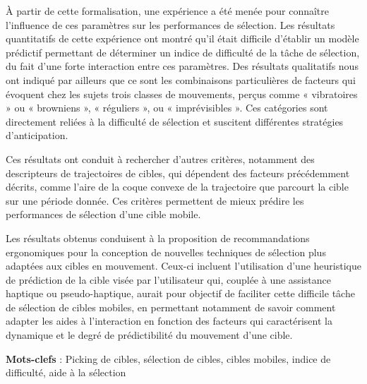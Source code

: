 À partir de cette formalisation, une expérience a été menée pour connaître l'influence de ces paramètres sur les performances de sélection. Les résultats quantitatifs de cette expérience ont montré qu'il était difficile d'établir un modèle prédictif permettant de déterminer un indice de difficulté de la tâche de sélection, du fait d'une forte interaction entre ces paramètres. Des résultats qualitatifs nous ont indiqué par ailleurs que ce sont les combinaisons particulières de facteurs qui évoquent chez les sujets trois classes de mouvements, perçus comme « vibratoires » ou « browniens », « réguliers », ou « imprévisibles ». Ces catégories sont directement reliées à la difficulté de sélection et suscitent différentes stratégies d'anticipation.

Ces résultats ont conduit à rechercher d'autres critères, notamment des descripteurs de trajectoires de cibles, qui dépendent des facteurs précédemment décrits, comme l'aire de la coque convexe de la trajectoire que parcourt la cible sur une période donnée. Ces critères permettent de mieux prédire les performances de sélection d'une cible mobile.

Les résultats obtenus conduisent à la proposition de recommandations ergonomiques pour la conception de nouvelles techniques de sélection plus adaptées aux cibles en mouvement. Ceux-ci incluent l'utilisation d'une heuristique de prédiction de la cible visée par l’utilisateur qui, couplée à une assistance haptique ou pseudo-haptique, aurait pour objectif de faciliter cette difficile tâche de sélection de cibles mobiles, en permettant notamment de savoir comment adapter les aides à l'interaction en fonction des facteurs qui caractérisent la dynamique et le degré de prédictibilité du mouvement d'une cible.
 


\textbf{Mots-clefs} : Picking de cibles, sélection de cibles, cibles mobiles, indice de difficulté, aide à la sélection